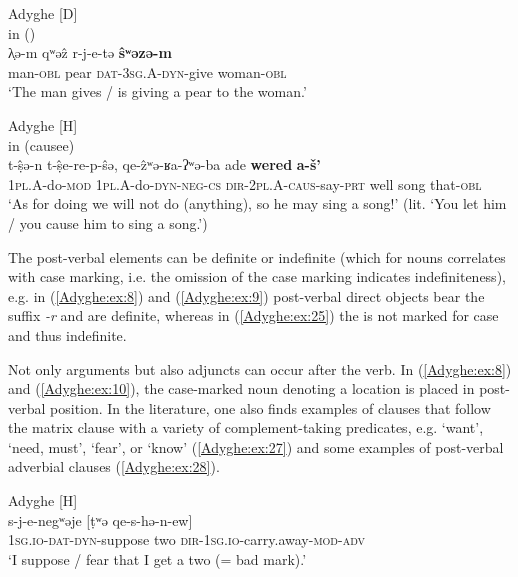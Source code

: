 \documentclass[output=paper,colorlinks,citecolor=brown, draft]{langscibook}
\begin{document}
\ea\label{Adyghe:ex:24}
Adyghe \citep[220]{paris1974princesse} [D] \\
in () \\
\gll λ̣ə-m qʷəẑ r-j-e-tə \textbf{ŝʷəzə-m} \\
man\textsc{-obl} pear \textsc{dat-}\textsc{3sg.A}\textsc{-dyn}-give woman\textsc{-obl} \\
\glt `The man gives / is giving a pear to the woman.'
\z

\ea\label{Adyghe:ex:25}
Adyghe \citep[388]{letuchiy2009affiksy} [H] \\
in (causee) \\
\gll t-ṣ̂ə-n t-ṣ̂e-re-p-ŝə, qe-ẑʷə-ʁa-ʔʷə-ba ade \textbf{wered} \textbf{a-š'} \\
\textsc{1pl.A}-do\textsc{-mod} \textsc{1pl.A}-do\textsc{-dyn}\textsc{-neg}\textsc{-cs} \textsc{dir-}\textsc{2pl.A-}\textsc{caus-}say\textsc{-prt} well song that\textsc{-obl} \\
\glt `As for doing we will not do (anything), so he may sing a song!' (lit. `You let him / you cause him to sing a song.') 
\z

The post-verbal elements can be definite or indefinite (which for nouns correlates with case marking, i.e. the omission of the case marking indicates indefiniteness), e.g. in (\ref{Adyghe:ex:8}) and (\ref{Adyghe:ex:9}) post-verbal direct objects bear the  suffix \textit{-r} and are definite, whereas in (\ref{Adyghe:ex:25}) the  is not marked for case and thus indefinite.

Not only arguments but also adjuncts can occur after the verb. In (\ref{Adyghe:ex:8}) and (\ref{Adyghe:ex:10}), the case-marked noun denoting a location is placed in post-verbal position. In the literature, one also finds examples of  clauses that follow the matrix clause with a variety of complement-taking predicates, e.g. `want', `need, must', `fear', or `know' (\ref{Adyghe:ex:27}) and some examples of post-verbal adverbial clauses (\ref{Adyghe:ex:28}). 

\ea\label{Adyghe:ex:27}
Adyghe \citep[533]{serdobolskaya2009semantika} [H] \\
\gll s-j-e-negʷəje [ṭʷə qe-s-hə-n-ew] \\
\textsc{1sg.}\textsc{io-}\textsc{dat-}\textsc{dyn-}suppose two \textsc{dir-}\textsc{1sg.}\textsc{io-}carry.away\textsc{-mod}\textsc{-adv} \\
\glt `I suppose / fear that I get a two (= bad mark).' 
\z
\end{document}
